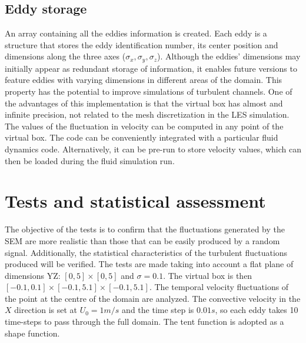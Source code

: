 \documentclass{juliacon}
\begin{document}
\subsection{Eddy storage}
An array containing all the eddies information is created. Each eddy is a structure that stores the eddy identification number, its center position and dimensions along the three axes ($\sigma_x, \sigma_y, \sigma_z$). Although the eddies' dimensions may initially appear as redundant storage of information, it enables future versions to feature eddies with varying dimensions in different areas of the domain. This property has the potential to improve simulations of turbulent channels.
One of the advantages of this implementation is that the virtual box has almost and infinite precision, not related to the mesh discretization in the LES simulation. The values of the fluctuation in velocity can be computed in any point of the virtual box.
The code can be conveniently integrated with a particular fluid dynamics code. Alternatively, it can be pre-run to store velocity values, which can then be loaded during the fluid simulation run.

\section{Tests and statistical assessment}
The objective of the tests is to confirm that the fluctuations generated by the SEM are more realistic than those that can be easily produced by a random signal. Additionally, the statistical characteristics of the turbulent fluctuations produced will be verified. The tests are made taking into account a flat plane of dimensions YZ: $[0,5]\times[0,5]$ and $\sigma=0.1$. The virtual box is then $[-0.1,0.1]\times[-0.1,5.1]\times[-0.1,5.1]$. The temporal velocity fluctuations of the point at the centre of the domain are analyzed. The convective velocity in the $X$ direction is set at $U_0=1m/s$ and the time step is $0.01s$, so each eddy takes 10 time-steps to pass through the full domain. The tent function is adopted as a shape function.
\end{document}
